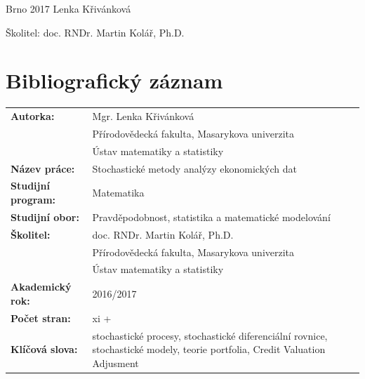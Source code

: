 \documentclass[a4paper,12pt]{report}
\theoremstyle{definition} \newtheorem{definice}[veta]{Definice}
\theoremstyle{remark}
\begin{document}
\begin{center}
\Large{Brno 2017} \hfill \Large{Lenka Křivánková}
\end{center}
\vspace{2mm}
\begin{center}
\large{Školitel: doc. RNDr. Martin Kolář, Ph.D.}
\end{center}

\normalsize



\chapter*{Bibliografický záznam}%
\thispagestyle{empty}

\begin{tabular}{p{4.5cm}  p{8.5cm}} %
\textbf{Autorka:} & Mgr. Lenka Křivánková \\
& Přírodovědecká fakulta, Masarykova univerzita\\
& Ústav matematiky a statistiky\\
\textbf{Název práce:} & Stochastické metody analýzy ekonomických dat \\
\textbf{Studijní program:} & Matematika \\
\textbf{Studijní obor:} & Pravděpodobnost, statistika a matematické modelování \\
\textbf{Školitel:} & doc. RNDr. Martin Kolář, Ph.D.  \\
& Přírodovědecká fakulta, Masarykova univerzita\\
& Ústav matematiky a statistiky\\
\textbf{Akademický rok:} & 2016/2017 \\
\textbf{Počet stran:} & xi + \pageref*{LastPage} \\%
\textbf{Klíčová slova:} & stochastické procesy, stochastické diferenciální rovnice, stochastické modely, teorie portfolia, Credit Valuation Adjusment\\
\end{tabular}
\\\\\\\\\\
\end{document}
